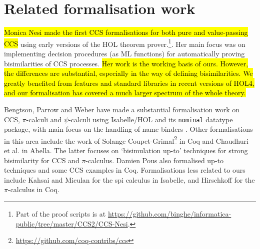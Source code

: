 \section{Related formalisation work}
\label{s:rel}

\hl{Monica Nesi made the first CCS formalisations for both pure and
value-passing CCS} \cite{Nesi:1992ve,Nesi:2017wo} using early versions of the HOL
theorem prover.\footnote{Part of 
 the proof scripts is at \url{https://github.com/binghe/informatica-public/tree/master/CCS2/CCS-Nesi}.}.
Her main focus was on implementing decision procedures (as ML functions) for
automatically proving bisimilarities of CCS
processes. %
\hl{Her work is
  the working basis of ours. However, the differences are substantial, especially in the way of defining
bisimilarities. We greatly benefited from features and standard
libraries in recent versions of HOL4, and our formalisation has
covered a much larger spectrum of the whole theory.}

Bengtson,  Parrow and Weber
have made a substantial formalisation work 
on CCS, $\pi$-calculi
and $\psi$-calculi 
using Isabelle/HOL and its \texttt{nominal} datatype package, with main focus on the handling of
name binders \cite{bengtson2010formalising,bengtson2007completeness,bengtson2007formalising}.
%
Other formalisations in this area include the work of Solange
Coupet-Grimal\footnote{\url{https://github.com/coq-contribs/ccs}} in Coq
and Chaudhuri et al.\;\cite{chaudhuri2015lightweight} in Abella. The
latter focuses on `bisimulation up-to' techniques for strong bisimilarity 
for CCS and $\pi$-calculus.
Damien Pous also formalised up-to techniques and some CCS examples in
Coq. \cite{pous2007new}
Formalisations less related to ours
include Kahsai and Miculan \cite{kahsai2008implementing} for the spi
calculus  in Isabelle, and Hirschkoff \cite{hirschkoff1997full} for the $\pi$-calculus in Coq.
